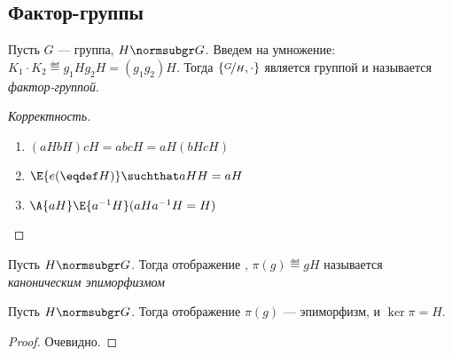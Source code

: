\subsection{Фактор-группы}
\begin{definition}
  Пусть $G$ --- группа, $H\normsubgr G$. Введем на  умножение:\\
  $K_1\cdot K_2 \eqdef g_1Hg_2H=(g_1g_2)H$. Тогда $\{\factorgr{G}{H}, \cdot\}$ является группой и называется \emph{фактор-группой}.
\end{definition}
\begin{proof}[Корректность]
  \theoremlistshack
  \begin{enumerate}
    \item $(aHbH)cH=abcH=aH(bHcH)$
    \item $\E{e(\eqdef H)}\suchthat aHH=aH$
    \item $\A{aH} \E{a^{-1} H}(aHa^{-1} H=H)$
  \end{enumerate}
\end{proof}

\begin{definition}
  Пусть $H\normsubgr G$. Тогда отображение , $\pi(g)\eqdef gH$ называется \emph{каноническим эпиморфизмом}
\end{definition}

\begin{theorem} \label{th:canepi1}
  Пусть $H\normsubgr G$. Тогда отображение $\pi(g)$ --- эпиморфизм, и $\ker \pi=H$.
\end{theorem}
\begin{proof}
  Очевидно.
\end{proof}

